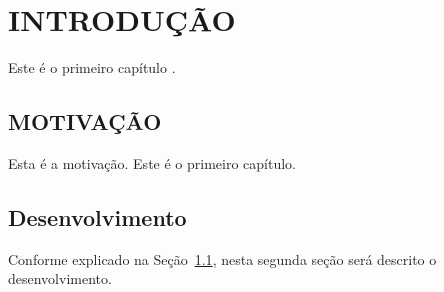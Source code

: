 \chapter{\thechapter \hspace{3mm} INTRODU\c{C}\~AO} \label{cap:cap1}

Este \'e o primeiro cap\'itulo \thepage. 

\section{MOTIVA\c{C}\~AO}\label{sec:motivation}

Esta \'e a motiva\c{c}\~ao. 
Este \'e o primeiro cap\'itulo. 
 


\section{Desenvolvimento}\label{sec:desenv}

Conforme explicado na Se\c{c}\~ao~\ref{sec:motivation}, nesta segunda se\c{c}\~ao ser\'a descrito o desenvolvimento.